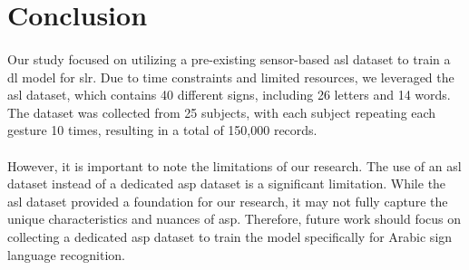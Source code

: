 \section{Conclusion}
\paragraph{}
Our study focused on utilizing a pre-existing sensor-based \ac{asl} dataset to train a \ac{dl} model for \ac{slr}. Due to time constraints and limited resources, we leveraged the \ac{asl} dataset, which contains 40 different signs, including 26 letters and 14 words. The dataset was collected from 25 subjects, with each subject repeating each gesture 10 times, resulting in a total of 150,000 records.
\paragraph{}
However, it is important to note the limitations of our research. The use of an \ac{asl} dataset instead of a dedicated \ac{asp} dataset is a significant limitation. While the \ac{asl} dataset provided a foundation for our research, it may not fully capture the unique characteristics and nuances of \ac{asp}. Therefore, future work should focus on collecting a dedicated \ac{asp} dataset to train the model specifically for Arabic sign language recognition.